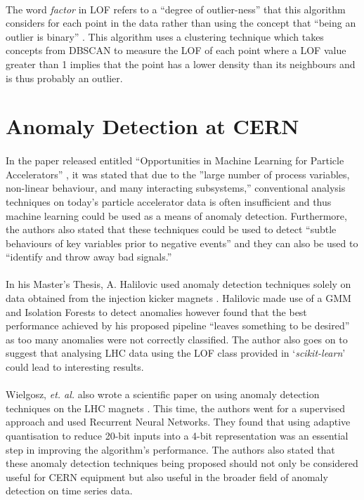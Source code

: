 \paragraph{ }The word \textit{factor} in \acs{LOF} refers to a ``degree of outlier-ness'' that this algorithm considers for each point in the data rather than using the concept that ``being an outlier is binary'' \cite{Breunig2000}. This algorithm uses a clustering technique which takes concepts from \acs{DBSCAN} to measure the \acs{LOF} of each point where a \acs{LOF} value greater than 1 implies that the point has a lower density than its neighbours and is thus probably an outlier.

\section{Anomaly Detection at CERN}

\paragraph{ }In the paper released entitled ``Opportunities in Machine Learning for Particle Accelerators'' \cite{Edelen2018}, it was stated that due to the ''large number of process variables, non-linear behaviour, and many interacting subsystems,'' conventional analysis techniques on today's particle accelerator data is often insufficient and thus machine learning could be used as a means of anomaly detection. Furthermore, the authors also stated that these techniques could be used to detect ``subtle behaviours of key variables prior to negative events'' and they can also be used to ``identify and throw away bad signals.''

\paragraph{ }In his Master's Thesis, A. Halilovic used anomaly detection techniques solely on data obtained from the injection kicker magnets \cite{Halilovic2018}. Halilovic made use of a \ac{GMM} and Isolation Forests to detect anomalies however found that the best performance achieved by his proposed pipeline ``leaves something to be desired'' as too many anomalies were not correctly classified. The author also goes on to suggest that analysing \acs{LHC} data using the \acs{LOF} class provided in `\textit{scikit-learn}' could lead to interesting results.

\paragraph{ }Wielgosz, \textit{et. al.} also wrote a scientific paper on using anomaly detection techniques on the \acs{LHC} magnets \cite{Wielgosz2017}. This time, the authors went for a supervised approach and used Recurrent Neural Networks. They found that using adaptive quantisation to reduce 20-bit inputs into a 4-bit representation was an essential step in improving the algorithm's performance. The authors also stated that these anomaly detection techniques being proposed should not only be considered useful for \acs{CERN} equipment but also useful in the broader field of anomaly detection on time series data.

